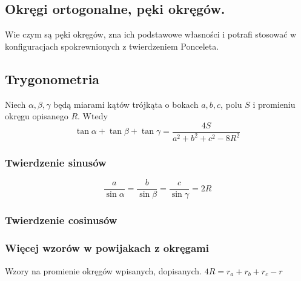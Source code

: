 \subsection{Okręgi ortogonalne, pęki okręgów.}
Wie czym są pęki okręgów, zna ich podstawowe własności i potrafi stosować w konfiguracjach spokrewnionych z twierdzeniem Ponceleta.   




\subsection{Trygonometria}

\begin{proposition}
	Niech $\alpha, \beta, \gamma$ będą miarami kątów trójkąta o bokach $a, b, c$, polu $S$ i promieniu okręgu opisanego $R$.
	Wtedy
	\begin{equation}
		\tan \alpha + \tan \beta + \tan \gamma = \frac{4S}{a^2 + b^2 + c^2 - 8R^2}
	\end{equation}
\end{proposition}

\subsubsection{Twierdzenie sinusów}

$$\frac{a}{\sin \alpha} = \frac{b}{\sin \beta} = \frac{c}{\sin \gamma} = 2R$$


\subsubsection{Twierdzenie cosinusów}


\subsubsection{Więcej wzorów w powijakach z okręgami}
Wzory na promienie okręgów wpisanych, dopisanych.
$4R = r_a + r_b + r_c - r$ %

